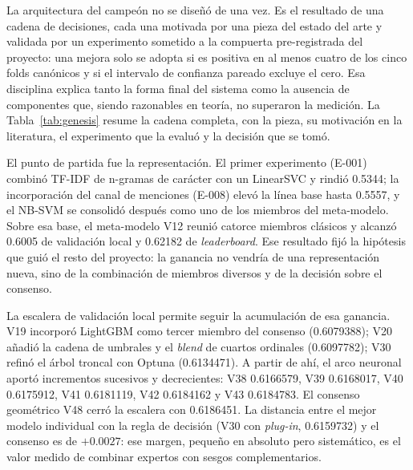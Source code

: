 \documentclass[journal]{IEEEtai}
\begin{document}
La arquitectura del campe\'on no se dise\~n\'o de una vez. Es el resultado de una cadena de
decisiones, cada una motivada por una pieza del estado del arte y validada por un experimento
sometido a la compuerta pre-registrada del proyecto: una mejora solo se adopta si es positiva en al
menos cuatro de los cinco folds can\'onicos y si el intervalo de confianza pareado excluye el cero.
Esa disciplina explica tanto la forma final del sistema como la ausencia de componentes que, siendo
razonables en teor\'ia, no superaron la medici\'on. La Tabla~\ref{tab:genesis} resume la cadena
completa, con la pieza, su motivaci\'on en la literatura, el experimento que la evalu\'o y la
decisi\'on que se tom\'o.

El punto de partida fue la representaci\'on. El primer experimento (E-001) combin\'o TF-IDF de
n-gramas de car\'acter con un LinearSVC y rindi\'o 0.5344; la incorporaci\'on del canal de
menciones (E-008) elev\'o la l\'inea base hasta 0.5557, y el NB-SVM \cite{wang2012} se consolid\'o
despu\'es como uno de los miembros del meta-modelo. Sobre esa base, el meta-modelo V12 reuni\'o catorce
miembros cl\'asicos y alcanz\'o 0.6005 de validaci\'on local y 0.62182 de \textit{leaderboard}. Ese
resultado fij\'o la hip\'otesis que gui\'o el resto del proyecto: la ganancia no vendr\'ia de una
representaci\'on nueva, sino de la combinaci\'on de miembros diversos y de la decisi\'on sobre el
consenso.

La escalera de validaci\'on local permite seguir la acumulaci\'on de esa ganancia. V19 incorpor\'o
LightGBM \cite{ke2017} como tercer miembro del consenso (0.6079388); V20 a\~nadi\'o la cadena de
umbrales y el \textit{blend} de cuartos ordinales \cite{frank2001} (0.6097782); V30 refin\'o el
\'arbol troncal con Optuna (0.6134471). A partir de ah\'i, el arco neuronal aport\'o incrementos
sucesivos y decrecientes: V38 0.6166579, V39 0.6168017, V40 0.6175912, V41 0.6181119, V42
0.6184162 y V43 0.6184783. El consenso geom\'etrico V48 cerr\'o la escalera con 0.6186451. La
distancia entre el mejor modelo individual con la regla de decisi\'on (V30 con \textit{plug-in},
0.6159732) y el consenso es de $+0.0027$: ese margen, peque\~no en absoluto pero sistem\'atico, es
el valor medido de combinar expertos con sesgos complementarios.
\end{document}
